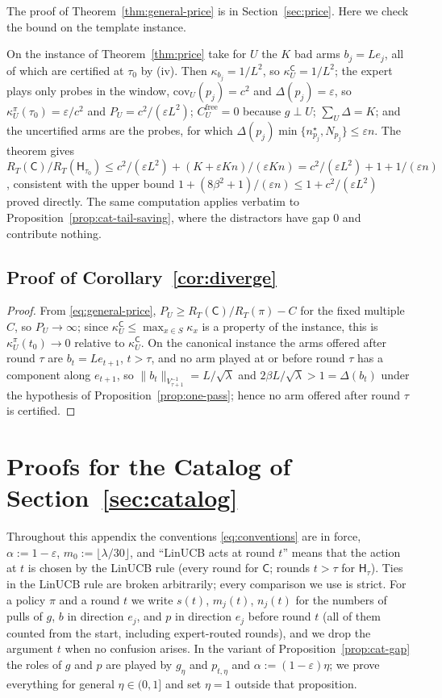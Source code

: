 \documentclass{article}
\theoremstyle{definition}
\theoremstyle{remark}
\newcommand{\eps}{\varepsilon}
\theoremstyle{remark}
\newcommand{\Cold}{\mathsf{C}}
\newcommand{\Hyb}{\mathsf{H}}
\begin{document}
The proof of Theorem~\ref{thm:general-price} is in Section~\ref{sec:price}.
Here we check the bound on the template instance.

On the instance of Theorem~\ref{thm:price} take for $U$ the $K$ bad arms
$b_j=Le_j$, all of which are certified at $\tau_0$ by (iv). Then
$\kappa_{b_j}=1/L^2$, so $\kappa^{\Cold}_U=1/L^2$;
the expert plays only probes in the window, $\mathrm{cov}_U(p_j)=c^2$ and
$\Delta(p_j)=\eps$, so $\kappa^\pi_U(\tau_0)=\eps/c^2$ and $P_U=c^2/(\eps L^2)$;
$C^{\mathrm{free}}_U=0$ because $g\perp U$; $\sum_U\Delta=K$; and the
uncertified arms are the probes, for which
$\Delta(p_j)\min\{n^\star_{p_j},N_{p_j}\}\le\eps n$. The theorem gives
$R_T(\Cold)/R_T(\Hyb_{\tau_0})\le c^2/(\eps L^2)+(K+\eps Kn)/(\eps Kn)=c^2/(\eps L^2)+1+1/(\eps n)$,
consistent with the upper bound $1+(8\beta^2+1)/(\eps n)\le1+c^2/(\eps L^2)$
proved directly. The same computation applies verbatim to
Proposition~\ref{prop:cat-tail-saving}, where the distractors have gap $0$
and contribute nothing.

\subsection{Proof of Corollary~\ref{cor:diverge}}
\label{app:proof-diverge}

\begin{proof}
From \eqref{eq:general-price}, $P_U\ge R_T(\Cold)/R_T(\pi)-C$ for the
fixed multiple $C$, so $P_U\to\infty$; since $\kappa^{\Cold}_U\le\max_{x\in S}\kappa_x$ is a
property of the instance, this is $\kappa^\pi_U(t_0)\to0$ relative to $\kappa^{\Cold}_U$.
On the canonical instance the arms offered after round $\tau$ are
$b_t=Le_{t+1}$, $t>\tau$, and no arm played at or before round $\tau$ has a
component along $e_{t+1}$, so $\|b_t\|_{V_{\tau+1}^{-1}}=L/\sqrt\lambda$ and
$2\beta L/\sqrt\lambda>1=\Delta(b_t)$ under the hypothesis of
Proposition~\ref{prop:one-pass}; hence no arm offered after round $\tau$ is certified.
\end{proof}

\section{Proofs for the Catalog of Section~\ref{sec:catalog}}
\label{app:catalog}

Throughout this appendix the conventions \eqref{eq:conventions} are in force,
$\alpha:=1-\eps$, $m_0:=\lfloor\lambda/30\rfloor$, and ``LinUCB acts at round
$t$'' means that the action at $t$ is chosen by the LinUCB rule (every round
for $\Cold$; rounds $t>\tau$ for $\Hyb_\tau$). Ties in the LinUCB rule are
broken arbitrarily; every comparison we use is strict. For a policy $\pi$ and
a round $t$ we write $s(t)$, $m_j(t)$, $n_j(t)$ for the numbers of pulls of
$g$, $b$ in direction $e_j$, and $p$ in direction $e_j$ before round $t$
(all of them counted from the start, including expert-routed rounds), and we
drop the argument $t$ when no confusion arises. In the variant of
Proposition~\ref{prop:cat-gap} the roles of $g$ and $p$ are played by
$g_\eta$ and $p_{t,\eta}$ and $\alpha:=(1-\eps)\eta$; we prove everything for
general $\eta\in(0,1]$ and set $\eta=1$ outside that proposition.
\end{document}
